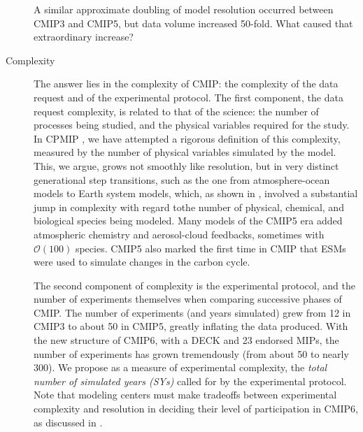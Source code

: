 \documentclass[gmd,manuscript]{copernicus}
\newcommand{\pllabel}[1]{\label{p-#1}\linelabel{l-#1}}
\begin{document}
\begin{description}
  A similar approximate doubling of model resolution occurred between CMIP3 
  and CMIP5, but data volume increased 50-fold. What caused that
  extraordinary increase?
\item[Complexity] The answer lies in the complexity of CMIP: the
  complexity of the data request and of the experimental protocol.
  The first component, the
  \pllabel{RC1-19}
  data request complexity, is related to that of the science: the
  number of processes being studied, and the physical variables
  required for the study. In CPMIP \citep{ref:balajietal2017}, we have
  attempted a rigorous definition of this complexity, measured by the
  number of physical variables simulated by the model. This, we argue,
  grows not smoothly like resolution, but in very distinct
  generational step transitions, such as the one from atmosphere-ocean
  models to Earth system models, which, as shown in \cite{ref:balajietal2017},
   involved a substantial jump in
  complexity with regard tothe number of physical, chemical, and biological species
  being modeled.
  \pllabel{RC1-29a}
   Many models of the CMIP5 era added
  atmospheric chemistry and aerosol-cloud feedbacks, sometimes with
  $\mathcal{O}(100)$ species. CMIP5 also marked the first time in CMIP
  that ESMs were used to simulate changes in the carbon cycle.

  The second component of complexity is the experimental protocol, and 
  the number of experiments themselves when comparing successive phases of CMIP.
  The number of experiments (and years simulated) grew from 12 in CMIP3 to about 50
  in CMIP5, greatly inflating the data produced.
   With the new structure of CMIP6, with a DECK and 23 endorsed MIPs, the 
  \pllabel{RC3-11}
  number of experiments has grown tremendously (from about 50 to nearly 300). 
  We propose as a measure of experimental
  complexity, the \emph{total number of simulated years (SYs)}
  called for by the experimental protocol. 
  Note that 
  modeling centers must make tradeoffs between experimental
  complexity and resolution in deciding their level of participation
  in CMIP6, as discussed in \cite{ref:balajietal2017}.
\end{description}
\end{document}
